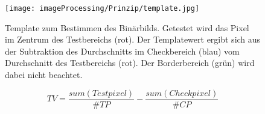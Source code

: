 
\begin{figure}[H]
\centering
\texttt{[image: imageProcessing/Prinzip/template.jpg]}
\caption[Template zum Bestimmen des Binärbilds]{Template zum Bestimmen des Binärbilds. Getestet wird das Pixel im Zentrum des Testbereichs (rot). Der Templatewert ergibt sich aus der Subtraktion des Durchschnitts im Checkbereich (blau) vom Durchschnitt des Testbereichs (rot). Der Borderbereich (grün) wird dabei nicht beachtet.}
\label{templImg}
\end{figure}

\begin{ownequation}[H]
\begin{equation}
TV = \frac{sum(Testpixel)}{\#TP} - \frac{sum(Checkpixel)}{\#CP}
\end{equation}
\caption[Templatewertberechnung für ein Pixel als Formelausdruck]{Templatewertberechnung für ein Pixel als Formelausdruck. $\#TP$ bezeichnet die Anzahl der Testpixel und $\#CP$ die Anzahl der Checkpixel.}
\label{templateValue}
\end{ownequation}

